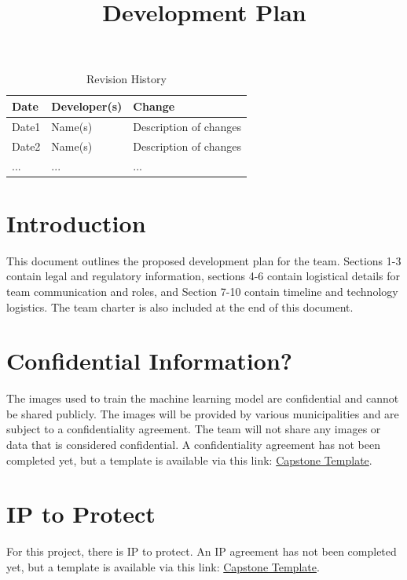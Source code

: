 \documentclass{article}
\title{Development Plan\\\progname}
\author{\authname}
\date{}
\begin{document}
\maketitle

\begin{table}[hp]
\caption{Revision History} \label{TblRevisionHistory}
\begin{tabularx}{\textwidth}{llX}
\toprule
\textbf{Date} & \textbf{Developer(s)} & \textbf{Change}\\
\midrule
Date1 & Name(s) & Description of changes\\
Date2 & Name(s) & Description of changes\\
... & ... & ...\\
\bottomrule
\end{tabularx}
\end{table}

\newpage{}

\section{Introduction}

This document outlines the proposed development plan for the team. Sections 1-3 contain legal and regulatory information, sections 4-6 contain logistical details for team communication and roles, and Section 7-10 contain timeline
and technology logistics. The team charter is also included at the end of this document.

\section{Confidential Information?}

The images used to train the machine learning model are confidential and cannot be shared publicly. The images will be provided by various municipalities and are subject to a confidentiality agreement.
The team will not share any images or data that is considered confidential. A confidentiality agreement has not been completed yet, but a template is available via this link: \href{../../Capstone Template - Confidentiality Only.docx}{Capstone Template}.

\section{IP to Protect}

For this project, there is IP to protect. An IP agreement has not been completed yet, but a template is available via this link: \href{../../Capstone Template - IP Owned By Company.docx}{Capstone Template}.
\end{document}
